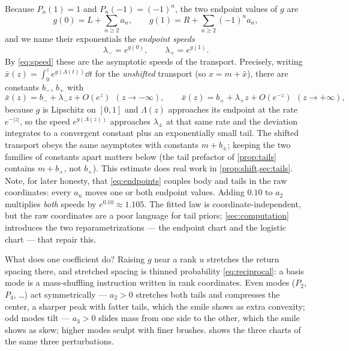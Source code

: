 Because $P_n(1)=1$ and $P_n(-1)=(-1)^{n}$, the two endpoint values of $g$
are
\begin{equation}
g(0)=L+\sum_{n\ge2}a_n,
\qquad
g(1)=R+\sum_{n\ge2}(-1)^{n}a_n ,
\label{eq:endpoints}
\end{equation}
and we name their exponentials the \emph{endpoint speeds}
\begin{equation}
\lambda_-=e^{g(0)},
\qquad
\lambda_+=e^{g(1)} .
\label{eq:speeds}
\end{equation}
By \eqref{eq:speed} these are the asymptotic speeds of the transport.
Precisely, writing $\bar{x}(z)=\int_0^z e^{g(\Lambda(t))}\dd t$ for the
\emph{unshifted} transport (so $x=m+\bar{x}$), there are constants
$b_-$, $b_+$ with
\begin{equation}
\bar{x}(z)=b_-+\lambda_-z+O(e^{z})\ \ (z\to-\infty),
\qquad
\bar{x}(z)=b_++\lambda_+z+O(e^{-z})\ \ (z\to+\infty),
\label{eq:asymptotes}
\end{equation}
because $g$ is Lipschitz on $[0,1]$ and $\Lambda(z)$ approaches its
endpoint at the rate $e^{-|z|}$, so the speed $e^{g(\Lambda(z))}$
approaches $\lambda_\pm$ at that same rate and the deviation integrates
to a convergent constant plus an exponentially small tail.  The shifted
transport obeys the same asymptotes with constants $m+b_\pm$; keeping
the two families of constants apart matters below (the tail prefactor
of \cref{prop:tails} contains $m+b_+$, not $b_+$).  This estimate does
real work in \cref{prop:shift,sec:tails}.  Note, for later honesty, that
\eqref{eq:endpoints} couples body and tails in the raw coordinates: every
$a_n$ moves one or both endpoint values.  Adding $0.10$ to $a_2$ multiplies
\emph{both} speeds by $e^{0.10}\approx1.105$.  The fitted law is
coordinate-independent, but the raw coordinates are a poor language for
tail priors; \cref{sec:computation} introduces the two reparametrizations
--- the endpoint chart and the logistic chart --- that repair this.

What does one coefficient do?  Raising $g$ near a rank $u$ stretches the
return spacing there, and stretched spacing is thinned probability
\eqref{eq:reciprocal}: a basis mode is a mass-shuffling instruction written
in rank coordinates.  Even modes ($P_2$, $P_4$, \dots) act symmetrically
--- $a_2>0$ stretches both tails and compresses the center, a sharper peak
with fatter tails, which the smile shows as extra convexity; odd modes tilt
--- $a_3>0$ slides mass from one side to the other, which the smile shows
as skew; higher modes sculpt with finer brushes.   shows
the three charts of the same three perturbations.

